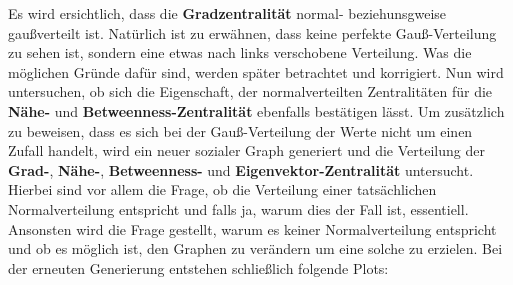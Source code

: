 Es wird ersichtlich, dass die \textbf{Gradzentralität} normal- beziehunsgweise gaußverteilt ist. Natürlich ist zu erwähnen, dass keine perfekte Gauß-Verteilung zu sehen ist, sondern eine etwas nach links verschobene Verteilung. Was die möglichen Gründe dafür sind, werden später betrachtet und korrigiert. Nun wird untersuchen, ob sich die Eigenschaft, der  normalverteilten Zentralitäten für die \textbf{Nähe-} und \textbf{Betweenness-Zentralität} ebenfalls bestätigen lässt. Um zusätzlich zu beweisen, dass es sich bei der Gauß-Verteilung der Werte nicht um einen Zufall handelt, wird ein neuer sozialer Graph generiert und die Verteilung der \textbf{Grad-}, \textbf{Nähe-}, \textbf{Betweenness-} und \textbf{Eigenvektor-Zentralität} untersucht. Hierbei sind vor allem die Frage, ob die Verteilung einer tatsächlichen Normalverteilung entspricht und falls ja, warum dies der Fall ist, essentiell. Ansonsten wird die Frage gestellt, warum es keiner Normalverteilung entspricht und ob es möglich ist, den Graphen zu verändern um eine solche zu erzielen. Bei der erneuten Generierung entstehen schließlich folgende Plots:

